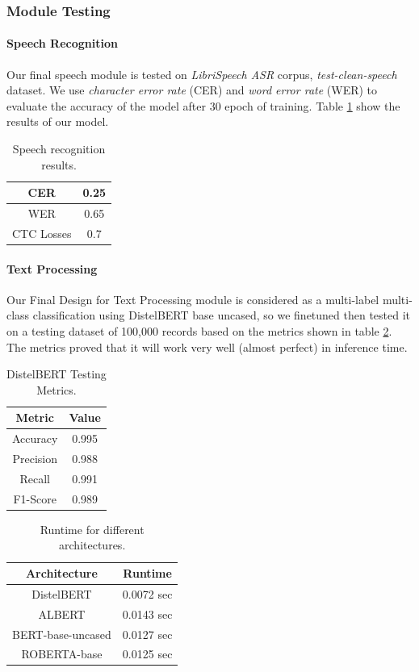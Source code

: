 \subsubsection{Module Testing}

\paragraph{Speech Recognition}
Our final speech module is tested on \emph{LibriSpeech ASR} corpus, \emph{test-clean-speech} dataset. We use \emph{character error rate} (CER) and \emph{word error rate} (WER) to evaluate the accuracy of the model after $30$ epoch of training. Table \ref{tab:speech_results} show the results of our model.
\begin{table}[ht]
\centering
\caption{Speech recognition results.}
\begin{tabular}[t]{| c | c |}
\hline
CER & 0.25 \\
\hline
WER & 0.65 \\
\hline
CTC Losses & 0.7 \\
\hline
\end{tabular}
\label{tab:speech_results}
\end{table}

\paragraph{Text Processing}
Our Final Design for Text Processing module is considered as a multi-label multi-class classification using DistelBERT base uncased, so we finetuned then tested it on  a testing dataset of 100,000 records based on the metrics shown in table \ref{tab:text_metrics}. The metrics proved that it will work very well (almost perfect) in inference time.

\begin{table}[ht]
\centering
\caption{DistelBERT Testing Metrics.}
\begin{tabular}[t]{| c | c |}
\hline
Metric & Value \\
\hline \hline
Accuracy & 0.995 \\
\hline
Precision & 0.988 \\
\hline
Recall & 0.991\\
\hline
F1-Score & 0.989 \\
\hline
\end{tabular}
\label{tab:text_metrics}
\end{table}

\begin{table}[ht]
\centering
\caption{Runtime for different architectures.}
\begin{tabular}[t]{| c | c |}
\hline
Architecture & Runtime \\
\hline \hline
DistelBERT & 0.0072 sec \\
\hline
ALBERT & 0.0143 sec \\
\hline
BERT-base-uncased & 0.0127 sec \\
\hline
ROBERTA-base & 0.0125 sec \\
\hline
\end{tabular}
\label{tab:text_runtime}
\end{table}

